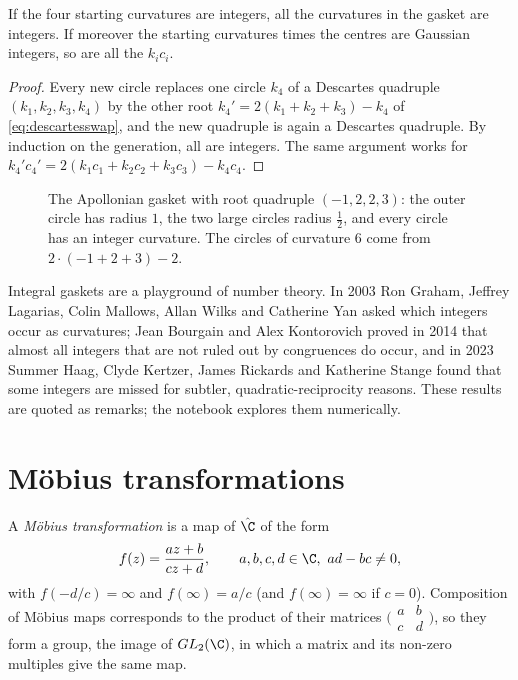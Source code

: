 \begin{corollary}\label{cor:integral}
If the four starting curvatures are integers, all the curvatures in the gasket are integers. If moreover the starting curvatures times
the centres are Gaussian integers, so are all the $k_ic_i$.
\end{corollary}
\begin{proof}
Every new circle replaces one circle $k_4$ of a Descartes quadruple $(k_1,k_2,k_3,k_4)$ by the other root $k_4'=2(k_1+k_2+k_3)-k_4$ of
\eqref{eq:descartesswap}, and the new quadruple is again a Descartes quadruple. By induction on the generation, all are integers. The same
argument works for $k_4'c_4'=2(k_1c_1+k_2c_2+k_3c_3)-k_4c_4$.
\end{proof}

\begin{figure}[ht]
\centering
{}
\caption{The Apollonian gasket with root quadruple $(-1,2,2,3)$: the outer circle has radius $1$, the two large circles radius $\frac12$, and every
circle has an integer curvature. The circles of curvature $6$ come from $2\cdot(-1+2+3)-2$.}
\label{fig:gasket}
\end{figure}

Integral gaskets are a playground of number theory. In 2003 Ron Graham, Jeffrey Lagarias, Colin Mallows, Allan Wilks and Catherine Yan
asked which integers occur as curvatures; Jean Bourgain and Alex Kontorovich proved in 2014 that almost all integers that are not ruled out by
congruences do occur, and in 2023 Summer Haag, Clyde Kertzer, James Rickards and Katherine Stange found that some integers are missed for
subtler, quadratic-reciprocity reasons. These results are quoted as remarks; the notebook explores them numerically.

\section{M\"obius transformations}

A \emph{M\"obius transformation} is a map of $\hat{\C}$ of the form
\[
f(z)=\frac{az+b}{cz+d},\qquad a,b,c,d\in\C,\ ad-bc\ne0,
\]
with $f(-d/c)=\infty$ and $f(\infty)=a/c$ (and $f(\infty)=\infty$ if $c=0$). Composition of M\"obius maps corresponds to the product of their
matrices $\bigl(\begin{smallmatrix}a&b\\c&d\end{smallmatrix}\bigr)$, so they form a group, the image of $GL_2(\C)$, in which a matrix and its non-zero
multiples give the same map.

